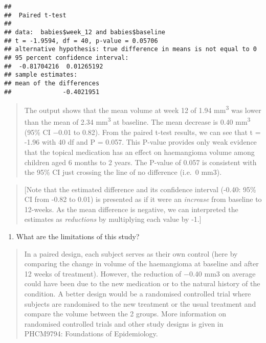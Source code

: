 \documentclass[
]{memoir}
\providecommand{\tightlist}{%
  \setlength{\itemsep}{0pt}\setlength{\parskip}{0pt}}
\begin{document}
\begin{verbatim}
## 
##  Paired t-test
## 
## data:  babies$week_12 and babies$baseline
## t = -1.9594, df = 40, p-value = 0.05706
## alternative hypothesis: true difference in means is not equal to 0
## 95 percent confidence interval:
##  -0.81704216  0.01265192
## sample estimates:
## mean of the differences 
##              -0.4021951
\end{verbatim}

\begin{quote}
The output shows that the mean volume at week 12 of 1.94 mm\textsuperscript{3} was lower than the mean of 2.34 mm\textsuperscript{3} at baseline. The mean decrease is 0.40 mm\textsuperscript{3} (95\% CI −0.01 to 0.82). From the paired t-test results, we can see that t = -1.96 with 40 df and P = 0.057. This P-value provides only weak evidence that the topical medication has an effect on haemangioma volume among children aged 6 months to 2 years. The P-value of 0.057 is consistent with the 95\% CI just crossing the line of no difference (i.e.~0 mm3).
\end{quote}

\begin{quote}
{[}Note that the estimated difference and its confidence interval (-0.40: 95\% CI from -0.82 to 0.01) is presented as if it were an \emph{increase} from baseline to 12-weeks. As the mean difference is negative, we can interpreted the estimates as \emph{reductions} by multiplying each value by -1.{]}
\end{quote}

\begin{enumerate}
\def\labelenumi{\alph{enumi})}
\setcounter{enumi}{2}
\tightlist
\item
  What are the limitations of this study?
\end{enumerate}

\begin{quote}
In a paired design, each subject serves as their own control (here by comparing the change in volume of the haemangioma at baseline and after 12 weeks of treatment). However, the reduction of −0.40 mm3 on average could have been due to the new medication or to the natural history of the condition. A better design would be a randomised controlled trial where subjects are randomised to the new treatment or the usual treatment and compare the volume between the 2 groups. More information on randomised controlled trials and other study designs is given in PHCM9794: Foundations of Epidemiology.
\end{quote}
\end{document}
